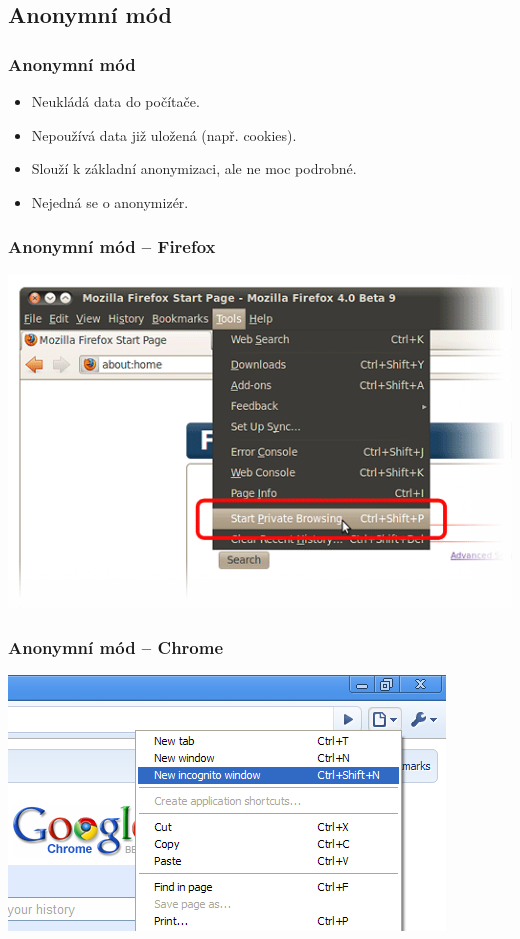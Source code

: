 \documentclass[xetex]{beamer}
\begin{document}
\subsection{Anonymní mód}

\begin{frame}
	\frametitle{Anonymní mód} 
	\begin{itemize} 
		\item Neukládá data do počítače.
		\item Nepoužívá data již uložená (např. cookies).
		\item Slouží k základní anonymizaci, ale ne moc podrobné.
		\item Nejedná se o anonymizér.
	\end{itemize} 
\end{frame}

\begin{frame}
 	\frametitle{Anonymní mód -- Firefox} 
	\includegraphics[scale=0.5]{pic/firefox-private2.png}
\end{frame}

\begin{frame}
 	\frametitle{Anonymní mód -- Chrome} 
	\includegraphics[scale=0.6]{pic/chromium-private2.png}
\end{frame}
\end{document}

